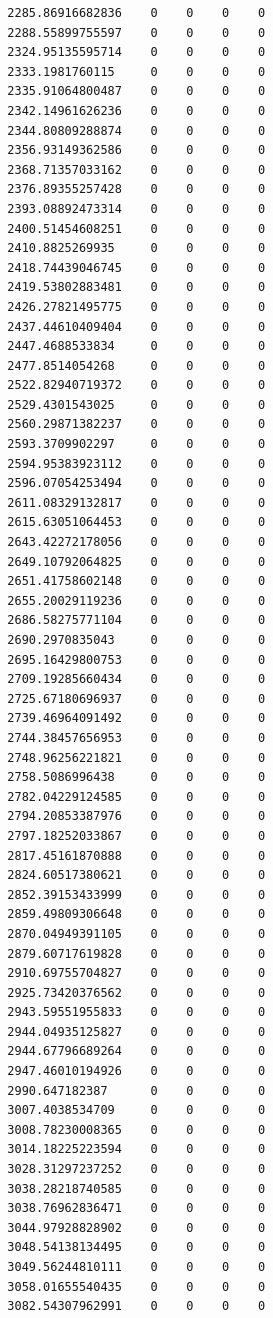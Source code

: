 \documentclass[
  letterpaper,
  DIV=11,
  numbers=noendperiod]{scrartcl}
\begin{document}
\begin{verbatim}
  2285.86916682836    0    0    0    0
  2288.55899755597    0    0    0    0
  2324.95135595714    0    0    0    0
  2333.1981760115     0    0    0    0
  2335.91064800487    0    0    0    0
  2342.14961626236    0    0    0    0
  2344.80809288874    0    0    0    0
  2356.93149362586    0    0    0    0
  2368.71357033162    0    0    0    0
  2376.89355257428    0    0    0    0
  2393.08892473314    0    0    0    0
  2400.51454608251    0    0    0    0
  2410.8825269935     0    0    0    0
  2418.74439046745    0    0    0    0
  2419.53802883481    0    0    0    0
  2426.27821495775    0    0    0    0
  2437.44610409404    0    0    0    0
  2447.4688533834     0    0    0    0
  2477.8514054268     0    0    0    0
  2522.82940719372    0    0    0    0
  2529.4301543025     0    0    0    0
  2560.29871382237    0    0    0    0
  2593.3709902297     0    0    0    0
  2594.95383923112    0    0    0    0
  2596.07054253494    0    0    0    0
  2611.08329132817    0    0    0    0
  2615.63051064453    0    0    0    0
  2643.42272178056    0    0    0    0
  2649.10792064825    0    0    0    0
  2651.41758602148    0    0    0    0
  2655.20029119236    0    0    0    0
  2686.58275771104    0    0    0    0
  2690.2970835043     0    0    0    0
  2695.16429800753    0    0    0    0
  2709.19285660434    0    0    0    0
  2725.67180696937    0    0    0    0
  2739.46964091492    0    0    0    0
  2744.38457656953    0    0    0    0
  2748.96256221821    0    0    0    0
  2758.5086996438     0    0    0    0
  2782.04229124585    0    0    0    0
  2794.20853387976    0    0    0    0
  2797.18252033867    0    0    0    0
  2817.45161870888    0    0    0    0
  2824.60517380621    0    0    0    0
  2852.39153433999    0    0    0    0
  2859.49809306648    0    0    0    0
  2870.04949391105    0    0    0    0
  2879.60717619828    0    0    0    0
  2910.69755704827    0    0    0    0
  2925.73420376562    0    0    0    0
  2943.59551955833    0    0    0    0
  2944.04935125827    0    0    0    0
  2944.67796689264    0    0    0    0
  2947.46010194926    0    0    0    0
  2990.647182387      0    0    0    0
  3007.4038534709     0    0    0    0
  3008.78230008365    0    0    0    0
  3014.18225223594    0    0    0    0
  3028.31297237252    0    0    0    0
  3038.28218740585    0    0    0    0
  3038.76962836471    0    0    0    0
  3044.97928828902    0    0    0    0
  3048.54138134495    0    0    0    0
  3049.56244810111    0    0    0    0
  3058.01655540435    0    0    0    0
  3082.54307962991    0    0    0    0

\end{verbatim}
\end{document}
